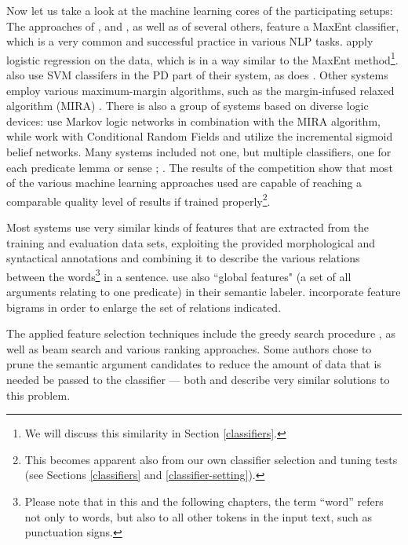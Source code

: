 \documentclass[12pt,notitlepage,a4paper]{report}
\begin{document}
Now let us take a look at the machine learning cores of the participating setups: The approaches of \citet{zhao09}, \citet{che09} and \citet{chen09}, as well as of several others, feature a MaxEnt classifier, which is a very common and successful practice in various NLP tasks. \citet{nugues09} apply logistic regression on the data, which is in a way similar to the MaxEnt method\footnote{We will discuss this similarity in Section \ref{classifiers}.}. \citet{che09} also use SVM classifers in the PD part of their system, as does \citet{tackstrom09}. Other systems \citep{bohnet09,asahara09} employ various maximum-margin algorithms, such as the margin-infused relaxed algorithm (MIRA) \citep{crammer03}. There is also a group of systems based on diverse logic devices: \citet{meza-ruiz09} use Markov logic networks in combination with the MIRA algorithm, while \citet{moreau09} work with Conditional Random Fields and \citet{merlo09} utilize the incremental sigmoid belief networks. Many systems included not one, but multiple classifiers, one for each predicate lemma or sense \citep{che09}; \citep{nugues09}. The results of the competition show that most of the various machine learning approaches used are capable of reaching a comparable quality level of results if trained properly\footnote{This becomes apparent also from our own classifier selection and tuning tests (see Sections \ref{classifiers} and \ref{classifier-setting}).}.

Most systems use very similar kinds of features that are extracted from the training and evaluation data sets, exploiting the provided morphological and syntactical annotations and combining it to describe the various relations between the words\footnote{Please note that in this and the following chapters, the term ``word'' refers not only to words, but also to all other tokens in the input text, such as punctuation signs.} in a sentence. \citet{asahara09} use also ``global features" (a set of all arguments relating to one predicate) in their semantic labeler. \citet{nugues09} incorporate feature bigrams in order to enlarge the set of relations indicated.

The applied feature selection techniques include the greedy search procedure \citep[among others]{nugues09,zeman09}, as well as beam search \citep[][and others]{merlo09,nugues09} and various ranking approaches. Some authors chose to prune the semantic argument candidates to reduce the amount of data that is needed be passed to the classifier --- both \citet{zhao09} and \citet{asahara09} describe very similar solutions to this problem.
\end{document}
